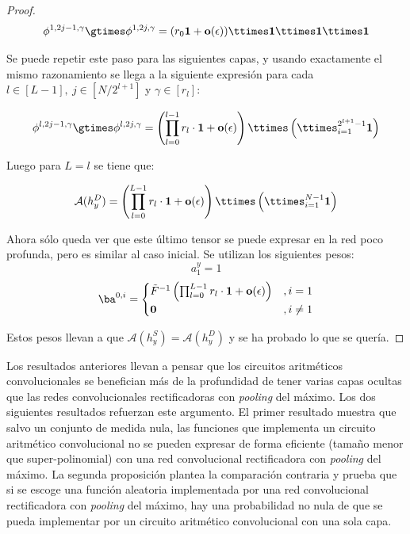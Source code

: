 \begin{proof}
$$
\phi^{1,2j-1,\gamma} \gtimes \phi^{1,2j,\gamma} = (r_0 \mathbf{1} + \textbf{o}(\epsilon))\ttimes \mathbf{1}\ttimes \mathbf{1} \ttimes \mathbf{1}
$$

Se puede repetir este paso para las siguientes capas, y usando exactamente el mismo razonamiento se llega a la siguiente expresión para cada $l\in[L-1], \ j \in [N/2^{l+1}]$ y $\gamma \in [r_l]$:

$$
\phi^{l,2j-1,\gamma} \gtimes \phi^{l,2j,\gamma} = \left( \prod_{l=0}^{l-1}r_l \cdot \mathbf{1} + \textbf{o}(\epsilon) \right) \ttimes \left( \ttimes^{2^{l+1}-1}_{i=1}\mathbf{1} \right)
$$

Luego para $L=l$ se tiene que:

$$
\mathcal{A}(h_y^D) =  \left( \prod_{l=0}^{L-1}r_l \cdot \mathbf{1} + \textbf{o}(\epsilon) \right) \ttimes \left( \ttimes^{N-1}_{i=1}\mathbf{1} \right)
$$

Ahora sólo queda ver que este último tensor se puede expresar en la red poco profunda, pero es similar al caso inicial. Se utilizan los siguientes pesos:
$$
a_1^y=1
$$
$$
\ba^{0,i} = \begin{cases}
\tilde{F}^{-1}\left(\prod_{l=0}^{L-1}r_l \cdot \mathbf{1} + \textbf{o}(\epsilon)\right) &, i=1\\
\mathbf{0} &, i\neq 1
\end{cases}
$$

Estos pesos llevan a que $\mathcal{A}(h_y^S) = \mathcal{A}(h_y^D)$ y se ha probado lo que se quería.

\end{proof}

Los resultados anteriores llevan a pensar que los circuitos aritméticos convolucionales se benefician más de la profundidad de tener varias capas ocultas que las redes convolucionales rectificadoras con \textit{pooling} del máximo. Los dos siguientes resultados refuerzan este argumento. El primer resultado muestra que salvo un conjunto de medida nula, las funciones que implementa un circuito aritmético convolucional no se pueden expresar de forma eficiente (tamaño menor que super-polinomial) con una red convolucional rectificadora con \textit{pooling} del máximo. La segunda proposición plantea la comparación contraria y prueba que si se escoge una función aleatoria implementada por una red convolucional rectificadora con \textit{pooling} del máximo, hay una probabilidad no nula de que se pueda implementar por un circuito aritmético convolucional con una sola capa.


